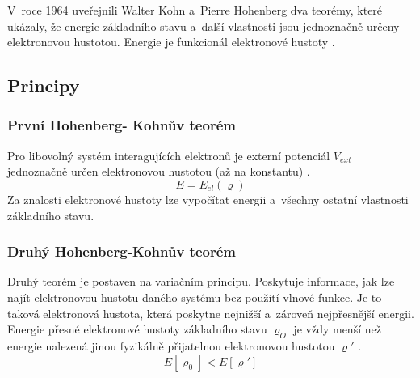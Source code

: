 \documentclass[
  printed, %
  table,   %
  lof,     %
  lot,     %
  oneside,
]{fithesis3}
\begin{document}
V~roce 1964 uveřejnili Walter Kohn a~Pierre Hohenberg dva teorémy, které ukázaly, že energie základního stavu  a~další vlastnosti jsou jednoznačně určeny elektronovou hustotou. Energie je funkcionál elektronové hustoty \cite{lechamolecularmodeling}.
\subsection{Principy}
\subsubsection{První Hohenberg- Kohnův teorém}
Pro libovolný systém interagujících elektronů je externí potenciál $V_{ext}$ jednoznačně
určen elektronovou hustotou (až na konstantu) \cite{dftshrnutivysledky}.
\begin{equation}
E = E_{el} (\varrho)
\end{equation}
 Za znalosti elektronové hustoty lze vypočítat energii a~všechny ostatní vlastnosti základního stavu.
\subsubsection{Druhý Hohenberg-Kohnův teorém}
Druhý teorém je postaven na variačním principu. Poskytuje informace, jak lze najít elektronovou hustotu daného systému bez použití vlnové funkce. Je to taková elektronová hustota, která poskytne nejnižší a~zároveň nejpřesnější energii.
\cite{koch2000chemist} 
Energie přesné elektronové hustoty základního stavu $\varrho_O$ je vždy menší  než energie nalezená jinou fyzikálně přijatelnou elektronovou hustotou $\varrho'$ \cite{Semradthesis}.
\begin{equation}
E [\varrho_0] < E[\varrho ']
\end{equation}
\end{document}
